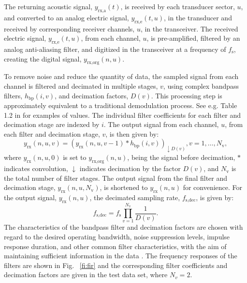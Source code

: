 \documentclass[preprint,12pt,TurnOnLineNumbers]{JASAnew}
\newcommand{\timesym}{t}
\newcommand{\samplesymt}{n}
\newcommand{\genidxsym}{i}
\newcommand{\channelsym}{u}
\newcommand{\stagesym}{v}
\newcommand{\nstages}{N_{\textrm{v}}}
\newcommand{\fs}{f_{\textrm{s}}}
\newcommand{\fsdec}{f_{\textrm{s,dec}}}
\newcommand{\yrxa}{y_{\textrm{rx,a}}}
\newcommand{\yrxe}{y_{\textrm{rx,e}}}
\newcommand{\yrx}{y_{\textrm{rx}}}
\newcommand{\yrxorg}{y_{\textrm{rx,org}}}
\newcommand{\decfac}{D}
\newcommand{\hbp}{h_{\textrm{bp}}}
\begin{document}
The returning acoustic signal, $\yrxa(\timesym)$, is received by each transducer sector, $\channelsym$, and converted to an analog electric signal, $\yrxe(\timesym,\channelsym)$, in the transducer and received by corresponding receiver channels, $\channelsym$, in the transceiver. The received electric signal, $\yrxe(\timesym,\channelsym)$, from each channel, $\channelsym$, is pre-amplified, filtered by an analog anti-aliasing filter, and digitized in the transceiver at a frequency of $\fs$, creating the digital signal, $\yrxorg(\samplesymt,\channelsym)$.

To remove noise and reduce the quantity of data, the sampled signal from each channel is filtered and decimated in multiple stages, $\stagesym$, using complex bandpass filters, $\hbp(\genidxsym,\stagesym)$, and decimation factors, $\decfac(\stagesym)$. This processing step is approximately equivalent to a traditional demodulation process. See e.g. Table 1.2 in \citep{Demer2017} for examples of values. The individual filter coefficients for each filter and decimation stage are indexed by $\genidxsym$. The output signal from each channel, $\channelsym$, from each filter and decimation stage, $\stagesym$, is then given by:
%
\begin{equation}
\label{eq:yrx}
\yrx(\samplesymt,\channelsym,\stagesym) = \left( \yrx(\samplesymt,\channelsym,\stagesym-1) * \hbp(\genidxsym,\stagesym) \right)_{\downarrow \decfac(\stagesym)}, 
\stagesym = 1,\ldots,\nstages,
\end{equation}
%
where $\yrx(\samplesymt,\channelsym,0)$ is set to $\yrxorg(\samplesymt,\channelsym)$, being the signal before decimation, $*$ indicates convolution, $\downarrow$ indicates decimation by the factor $\decfac(\stagesym)$, and $\nstages$ is the total number of filter stages. The output signal from the final filter and decimation stage, $\yrx(\samplesymt,\channelsym,\nstages)$, is shortened to $\yrx(\samplesymt,\channelsym)$ for convenience. For the output signal, $\yrx(\samplesymt,\channelsym)$, the decimated sampling rate, $\fsdec$, is given by:
%
\begin{equation}
\label{eq:fsdec}
\fsdec = \fs\prod_{\stagesym=1}^{\nstages} \frac{1}{\decfac(\stagesym)}.
\end{equation}
%
The characteristics of the bandpass filter and decimation factors are chosen with regard to the desired operating bandwidth, noise suppression levels, impulse response duration, and other common filter characteristics, with the aim of maintaining sufficient information in the data \citep{ProakisDSP,CrochireMDSP}. The frequency responses of the filters are shown in Fig. ~\ref{fi:fir} and the corresponding filter coefficients and decimation factors are given in the test data set, where $N_v=2$.
\end{document}
